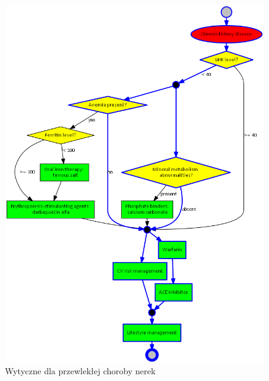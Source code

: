 \begin{figure}[H]
\centering
\includegraphics[scale=0.4]{img/rozwiazanie1ckd-simplified-ver-5.png}
\caption{Wytyczne dla przewlekłej choroby nerek}
\label{fig:ckd_rozw}
\end{figure}